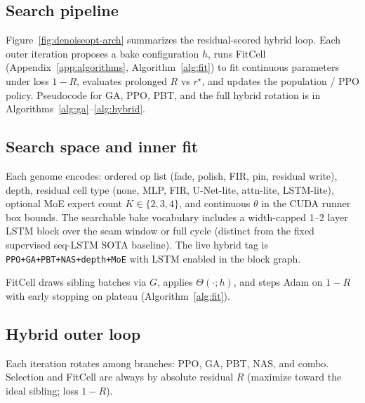 \subsection{Search pipeline}
\label{sec:pipeline-overview}

Figure~\ref{fig:denoiseopt-arch} summarizes the residual-scored hybrid loop.
Each outer iteration proposes a bake configuration $h$, runs FitCell (Appendix~\ref{app:algorithms}, Algorithm~\ref{alg:fit}) to fit continuous parameters under loss $1-R$, evaluates prolonged $R$ vs $r^{\star}$, and updates the population / PPO policy.
Pseudocode for GA, PPO, PBT, and the full hybrid rotation is in Algorithms~\ref{alg:ga}--\ref{alg:hybrid}.



\subsection{Search space and inner fit}
\label{sec:search-space}

Each genome encodes: ordered op list (fade, polish, FIR, pin, residual write), depth, residual cell type (none, MLP, FIR, U-Net-lite, attn-lite, LSTM-lite), optional MoE expert count $K\in\{2,3,4\}$, and continuous $\theta$ in the CUDA runner box bounds.
The searchable bake vocabulary includes a width-capped 1--2 layer LSTM block over the seam window or full cycle (distinct from the fixed supervised seq-LSTM SOTA baseline).
The live hybrid tag is \texttt{PPO+GA+PBT+NAS+depth+MoE} with LSTM enabled in the block graph.

FitCell draws sibling batches via $G$, applies $\Theta(\cdot;h)$, and steps Adam on $1-R$ with early stopping on plateau (Algorithm~\ref{alg:fit}).

\subsection{Hybrid outer loop}
\label{sec:hybrid}

Each iteration rotates among branches: PPO, GA, PBT, NAS, and combo.
Selection and FitCell are always by absolute residual $R$ (maximize toward the ideal sibling; loss $1-R$).

